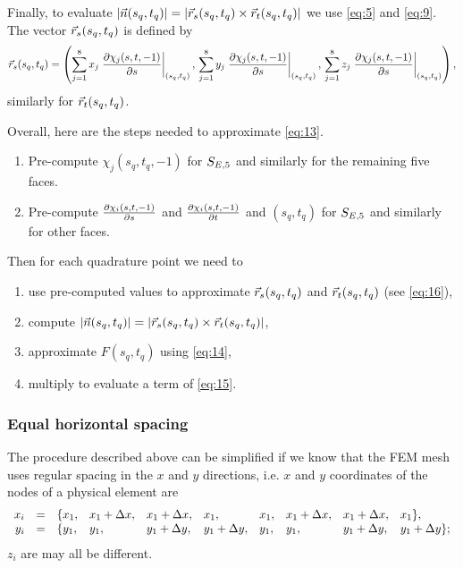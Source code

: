 \documentclass[11pt]{article}
\begin{document}
Finally, to evaluate $|\vec n(s_{q}, t_{q})| = | \vec r_{s}(s_{q}, t_{q}) \times
\vec r_{t}(s_{q}, t_{q}) |$ we use \eqref{eq:5} and \eqref{eq:9}.
The vector $\vec r_{s}(s_{q}, t_{q})$ is defined by
\begin{equation}
\label{eq:16}
\vec r_{s}(s_{q},t_{q}) = \left(
  \sum_{j=1}^{8} x_{j} \left.\frac{\partial \chi_{j}(s, t, -1)}{\partial s}\right|_{(s_{q}, t_{q})},\,
  \sum_{j=1}^{8} y_{j} \left.\frac{\partial \chi_{j}(s, t, -1)}{\partial s}\right|_{(s_{q}, t_{q})},\,
  \sum_{j=1}^{8} z_{j} \left.\frac{\partial \chi_{j}(s, t, -1)}{\partial s}\right|_{(s_{q}, t_{q})} \right),
\end{equation}
similarly for $\vec r_{t}(s_{q}, t_{q})$.

Overall, here are the steps needed to approximate \eqref{eq:13}.

\begin{enumerate}
\item Pre-compute $\chi_{j}(s_{q}, t_{q}, -1)$ for $S_{E,5}$ and similarly
for the remaining five faces.
\item Pre-compute $\frac{\partial \chi_{i}(s, t, -1)}{\partial s}$ and
$\frac{\partial \chi_{i}(s, t, -1)}{\partial t}$ and $(s_{q}, t_{q})$ for $S_{E,5}$ and similarly for
other faces.
\end{enumerate}

Then for each quadrature point we need to

\begin{enumerate}
\item use pre-computed values to approximate $\vec r_{s}(s_{q},t_{q})$ and
$\vec r_{t}(s_{q},t_{q})$ (see \eqref{eq:16}),
\item compute $|\vec n(s_{q}, t_{q})| = | \vec r_{s}(s_{q}, t_{q}) \times \vec r_{t}(s_{q}, t_{q}) |$,
\item approximate $F(s_{q}, t_{q})$ using \eqref{eq:14},
\item multiply to evaluate a term of \eqref{eq:15}.
\end{enumerate}

\subsubsection{Equal horizontal spacing}
\label{sec-4-1-1}

The procedure described above can be simplified if we know that the
FEM mesh uses regular spacing in the $x$ and $y$ directions, i.e.
$x$ and $y$ coordinates of the nodes of a physical element are
\begin{equation}
\label{eq:17}
\begin{array}{rcllllllll}
x_{i} &=& \{ x_{1}, &x_{1} + \Delta x, &x_{1} + \Delta x, &x_{1}, &x_{1}, &x_{1} + \Delta x, &x_{1} + \Delta x, &x_{1} \},\\
y_{i} &=& \{ y_{1}, &y_{1}, &y_{1} + \Delta y, &y_{1} + \Delta y, &y_{1}, &y_{1}, &y_{1} + \Delta y, &y_{1} + \Delta y \};\\
\end{array}
\end{equation}
$z_{i}$ are may all be different.
\end{document}
